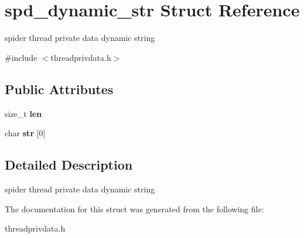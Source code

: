 \hypertarget{structspd__dynamic__str}{
\section{spd\_\-dynamic\_\-str Struct Reference}
\label{structspd__dynamic__str}
}


spider thread private data dynamic string  




{\ttfamily \#include $<$threadprivdata.h$>$}

\subsection*{Public Attributes}
\begin{DoxyCompactItemize}
\item 
\hypertarget{structspd__dynamic__str_aeb3d27beecae4e0c7e67e3f422e0e6e1}{
size\_\-t {\bfseries len}}
\label{structspd__dynamic__str_aeb3d27beecae4e0c7e67e3f422e0e6e1}

\item 
\hypertarget{structspd__dynamic__str_afda384d74313c83198f303c8eb646e8f}{
char {\bfseries str} \mbox{[}0\mbox{]}}
\label{structspd__dynamic__str_afda384d74313c83198f303c8eb646e8f}

\end{DoxyCompactItemize}


\subsection{Detailed Description}
spider thread private data dynamic string 

The documentation for this struct was generated from the following file:\begin{DoxyCompactItemize}
\item 
threadprivdata.h\end{DoxyCompactItemize}
